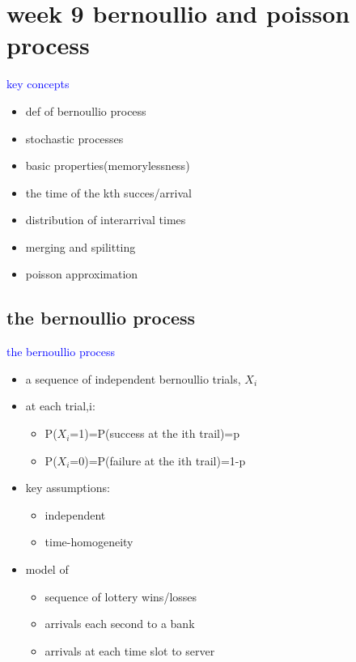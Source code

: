 \section{week 9 bernoullio and poisson process}

\textcolor{blue}{key concepts}
\begin{itemize}
    \item def of bernoullio process
    \item stochastic processes
    \item basic properties(memorylessness)
    \item the time of the kth succes/arrival
    \item distribution of interarrival times
    \item merging and spilitting
    \item poisson approximation
\end{itemize}

\subsection{the bernoullio process}


\textcolor{blue}{the bernoullio process}

\begin{itemize}
    \item a sequence of independent bernoullio trials, $X_i$
    \item at each trial,i:
    \begin{itemize}
        \item P($X_i$=1)=P(success at the ith trail)=p
        \item P($X_i$=0)=P(failure at the ith trail)=1-p 
    \end{itemize}
    \item key assumptions:
    \begin{itemize}
        \item independent
        \item time-homogeneity
    \end{itemize}
    \item model of 
    \begin{itemize}
        \item sequence of lottery wins/losses
        \item arrivals each second to a bank
        \item arrivals at each time slot to server
    \end{itemize}
\end{itemize}



